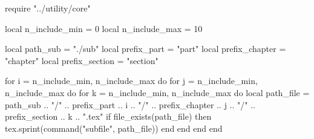 \documentclass[11pt, a4paper]{ltjsbook}
\date{\today}
\title{}
\author{}
\begin{document}
\maketitle
\tableofcontents

\begin{luacode*}
    require "../utility/core"

    local n_include_min = 0
    local n_include_max = 10

    local path_sub = "./sub"
    local prefix_part = "part"
    local prefix_chapter = "chapter"
    local prefix_section = "section"

    for i = n_include_min, n_include_max do
        for j = n_include_min, n_include_max do
            for k = n_include_min, n_include_max do
                local path_file = path_sub .. "/" .. prefix_part .. i .. "/" .. prefix_chapter .. j .. "/" .. prefix_section .. k .. ".tex"
                if file_exists(path_file) then
                    tex.sprint(command("subfile", path_file))
                end
            end
        end
    end
\end{luacode*}



\end{document}
